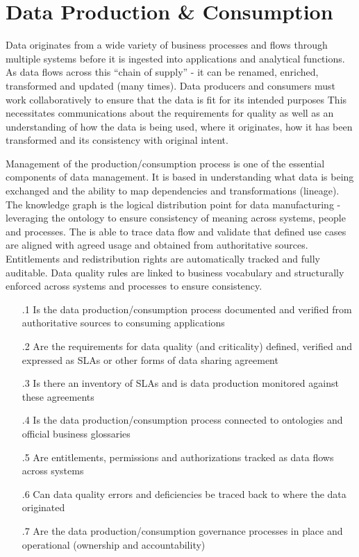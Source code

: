 \section{Data Production \& Consumption}\label{sec:ekgmm-b-4-3} %

Data originates from a wide variety of business processes and flows through multiple systems before it is ingested into applications and analytical functions.
As data flows across this “chain of supply” - it can be renamed, enriched, transformed and updated (many times).
Data producers and consumers must work collaboratively to ensure that the data is fit for its intended purposes
This necessitates communications about the requirements for quality as well as an understanding of how the data is being used,
where it originates, how it has been transformed and its consistency with original intent.

\kgmmekgrationalesection

Management of the production/consumption process is one of the essential components of data management.
It is based in understanding what data is being exchanged and the ability to map dependencies and transformations (lineage).
The knowledge graph is the logical distribution point for data manufacturing - leveraging the ontology to ensure consistency of meaning across systems, people and processes.
The  is able to trace data flow and validate that defined use cases are aligned with agreed usage and obtained from authoritative sources.
Entitlements and redistribution rights are automatically tracked and fully auditable.
Data quality rules are linked to business vocabulary and structurally enforced across systems and processes to ensure consistency.

\kgmmcorequestionssection

\begin{itemize}[leftmargin=.5in]

  \item [\thesection.1] Is the data production/consumption process documented and verified from authoritative sources to consuming applications
  \item [\thesection.2] Are the requirements for data quality (and criticality) defined, verified and expressed as SLAs or other forms of data sharing agreement
  \item [\thesection.3] Is there an inventory of SLAs and is data production monitored against these agreements
  \item [\thesection.4] Is the data production/consumption process connected to ontologies and official business glossaries
  \item [\thesection.5] Are entitlements, permissions and authorizations tracked as data flows across systems
  \item [\thesection.6] Can data quality errors and deficiencies be traced back to where the data originated
  \item [\thesection.7] Are the data production/consumption governance processes in place and operational (ownership and accountability)

\end{itemize}
